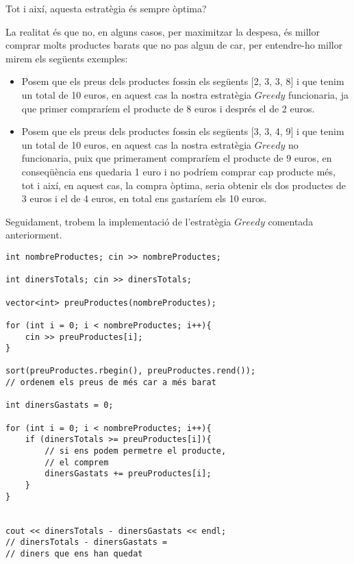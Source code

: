 Tot i així, aquesta estratègia és sempre òptima?

La realitat és que no, en alguns casos, per maximitzar la despesa, és millor comprar molts productes barats que no pas algun de car, per entendre-ho millor mirem els següents exemples: 


\begin{itemize}

\item Posem que els preus dels productes fossin els següents [2, 3, 3, 8] i que tenim un total de 10 euros, en aquest cas la nostra estratègia $Greedy$ funcionaria, ja que primer compraríem el producte de 8 euros i després el de 2 euros.

\item Posem que els preus dels productes fossin els següents [3, 3, 4, 9] i que tenim un total de 10 euros, en aquest cas la nostra estratègia $Greedy$ no funcionaria, puix que primerament compraríem el producte de 9 euros, en conseqüència ens quedaria 1 euro i no podríem comprar cap producte més, tot i així, en aquest cas, la compra òptima, seria obtenir els dos productes de 3 euros i el de 4 euros, en total ens gastaríem els 10 euros.

\end{itemize}

Seguidament, trobem la implementació de l'estratègia $Greedy$ comentada anteriorment.



\begin{lstlisting}
int nombreProductes; cin >> nombreProductes;

int dinersTotals; cin >> dinersTotals;

vector<int> preuProductes(nombreProductes);

for (int i = 0; i < nombreProductes; i++){
    cin >> preuProductes[i];
}

sort(preuProductes.rbegin(), preuProductes.rend());
// ordenem els preus de més car a més barat

int dinersGastats = 0;

for (int i = 0; i < nombreProductes; i++){
    if (dinersTotals >= preuProductes[i]){
        // si ens podem permetre el producte,
        // el comprem
        dinersGastats += preuProductes[i];
    }
}


cout << dinersTotals - dinersGastats << endl;
// dinersTotals - dinersGastats = 
// diners que ens han quedat 
\end{lstlisting}



